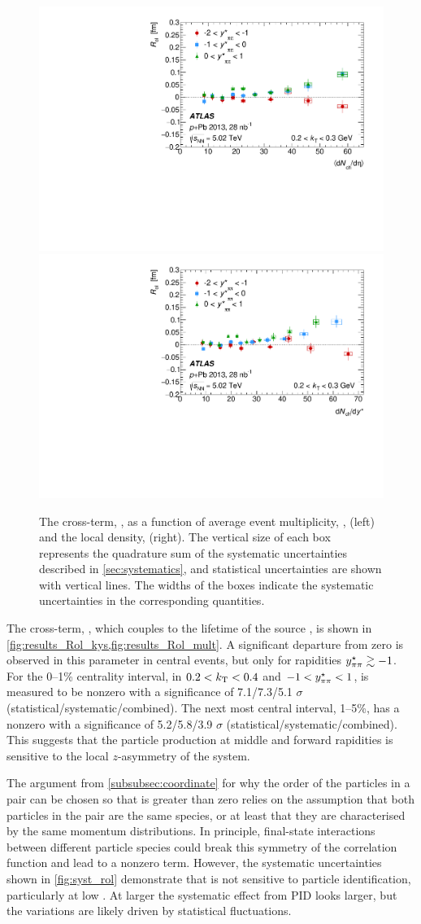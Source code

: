 \begin{figure}[t]
\centering
\includegraphics[width=0.49\linewidth]{canqosl_Rol_kt1_kys_vs_avg_mult.pdf}
\includegraphics[width=0.49\linewidth]{canqosl_Rol_kt1_vs_mult.pdf}
\caption{The cross-term, \Rol, as a function of average event multiplicity, \avgdNdeta, (left) and the local density, \dNdy (right). The vertical size of each box represents the quadrature sum of the systematic uncertainties described in \cref{sec:systematics}, and statistical uncertainties are shown with vertical lines. The widths of the boxes indicate the systematic uncertainties in the corresponding quantities.}
\label{fig:results_Rol_mult}
\end{figure}

The cross-term, \Rol, which couples to the lifetime of the source \cite{Chapman:1994yv}, is shown in \cref{fig:results_Rol_kys,fig:results_Rol_mult}.
A significant departure from zero is observed in this parameter in central events, but only for rapidities $y^{\star}_{\pi\pi} \gtrsim -1$.
For the 0--1\% centrality interval, in $ 0.2 < k_\mathrm{T} < 0.4$ and $-1 < y^{\star}_{\pi\pi} < 1$, \Rol is measured to be nonzero with a significance of 7.1/7.3/5.1 $\sigma$ (statistical/systematic/combined).
The next most central interval, 1--5\%, has a nonzero \Rol with a significance of 5.2/5.8/3.9 $\sigma$ (statistical/systematic/combined).
This suggests that the particle production at middle and forward rapidities is sensitive to the local $z$-asymmetry of the system.

The argument from \cref{subsubsec:coordinate} for why the order of the particles in a pair can be chosen so that \qout is greater than zero relies on the assumption that both particles in the pair are the same species, or at least that they are characterised by the same momentum distributions.
In principle, final-state interactions between different particle species could break this symmetry of the correlation function and lead to a nonzero \Rol term. 
However, the systematic uncertainties shown in \cref{fig:syst_rol} demonstrate that \Rol is not sensitive to particle identification, particularly at low \kt.
At larger \kt the systematic effect from \ac{PID} looks larger, but the variations are likely driven by statistical fluctuations.

